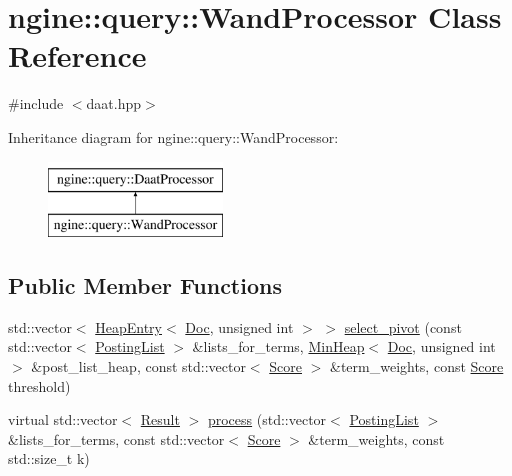 \hypertarget{classngine_1_1query_1_1WandProcessor}{}\section{ngine\+:\+:query\+:\+:Wand\+Processor Class Reference}
\label{classngine_1_1query_1_1WandProcessor}


{\ttfamily \#include $<$daat.\+hpp$>$}

Inheritance diagram for ngine\+:\+:query\+:\+:Wand\+Processor\+:\begin{figure}[H]
\begin{center}
\leavevmode
\includegraphics[height=2.000000cm]{classngine_1_1query_1_1WandProcessor}
\end{center}
\end{figure}
\subsection*{Public Member Functions}
\begin{DoxyCompactItemize}
\item 
std\+::vector$<$ \hyperlink{structngine_1_1HeapEntry}{Heap\+Entry}$<$ \hyperlink{structngine_1_1Doc}{Doc}, unsigned int $>$ $>$ \hyperlink{classngine_1_1query_1_1WandProcessor_a6363745437db39b4196a2858b6ea3a98}{select\+\_\+pivot} (const std\+::vector$<$ \hyperlink{classngine_1_1PostingList}{Posting\+List} $>$ \&lists\+\_\+for\+\_\+terms, \hyperlink{classngine_1_1MinHeap}{Min\+Heap}$<$ \hyperlink{structngine_1_1Doc}{Doc}, unsigned int $>$ \&post\+\_\+list\+\_\+heap, const std\+::vector$<$ \hyperlink{structngine_1_1Score}{Score} $>$ \&term\+\_\+weights, const \hyperlink{structngine_1_1Score}{Score} threshold)
\item 
virtual std\+::vector$<$ \hyperlink{structngine_1_1query_1_1Result}{Result} $>$ \hyperlink{classngine_1_1query_1_1WandProcessor_a7e25bc04d4e2efeab18944fd52a39a38}{process} (std\+::vector$<$ \hyperlink{classngine_1_1PostingList}{Posting\+List} $>$ \&lists\+\_\+for\+\_\+terms, const std\+::vector$<$ \hyperlink{structngine_1_1Score}{Score} $>$ \&term\+\_\+weights, const std\+::size\+\_\+t k)
\end{DoxyCompactItemize}


